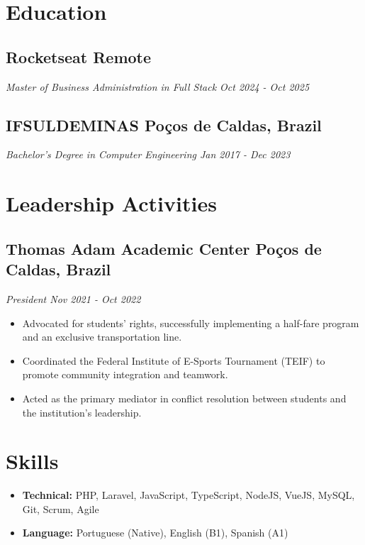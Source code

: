 \documentclass[a4paper,10pt]{article}
\begin{document}
\section{Education}
    \subsection*{\texorpdfstring{
        \textbf{Rocketseat} \hfill Remote
        }{
        Rocketseat -- Remote 
        }}
    \textit{Master of Business Administration in Full Stack \hfill Oct 2024 - Oct 2025}
    \subsection*{\texorpdfstring{
        \textbf{IFSULDEMINAS} \hfill Poços de Caldas, Brazil
        }{
        IFSULDEMINAS -- Poços de Caldas, Brazil
        }}
    \textit{Bachelor's Degree in Computer Engineering \hfill Jan 2017 - Dec 2023}

\section{Leadership Activities} 
    \subsection*{\texorpdfstring{
        \textbf{Thomas Adam Academic Center} \hfill Poços de Caldas, Brazil
        }{
        Thomas Adam Academic Center -- Poços de Caldas, Brazil
        }}
    \textit{President \hfill Nov 2021 - Oct 2022}
        \begin{itemize}
            \item Advocated for students' rights, successfully implementing a half-fare program and an exclusive transportation line.
            \item Coordinated the Federal Institute of E-Sports Tournament (TEIF) to promote community integration and teamwork.
            \item Acted as the primary mediator in conflict resolution between students and the institution's leadership.
        \end{itemize}

\section{Skills}
    \begin{itemize}
        \item \textbf{Technical:} PHP, Laravel, JavaScript, TypeScript, NodeJS, VueJS, MySQL, Git, Scrum, Agile
        \item \textbf{Language:} Portuguese (Native), English (B1), Spanish (A1)
    \end{itemize}
\end{document}

